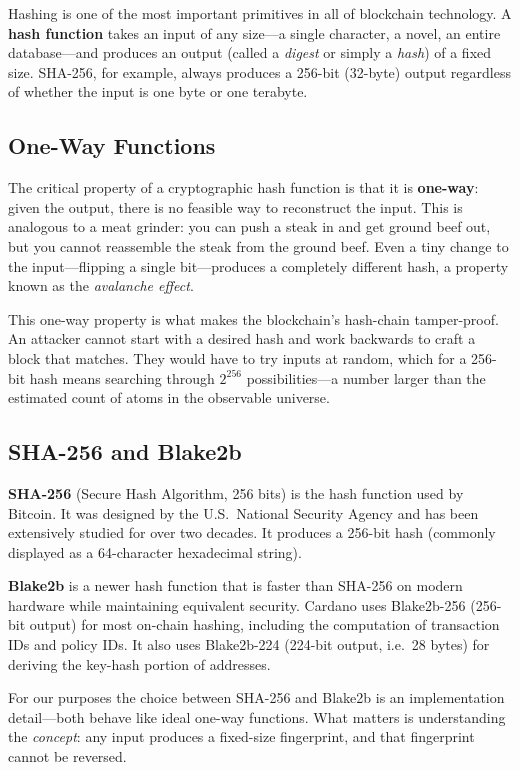 Hashing is one of the most important primitives in all of blockchain
technology.  A \textbf{hash function} takes an input of any size---a single
character, a novel, an entire database---and produces an output (called a
\emph{digest} or simply a \emph{hash}) of a fixed size.  SHA-256, for
example, always produces a 256-bit (32-byte) output regardless of whether the
input is one byte or one terabyte.

\subsection{One-Way Functions}

The critical property of a cryptographic hash function is that it is
\textbf{one-way}: given the output, there is no feasible way to reconstruct
the input.  This is analogous to a meat grinder: you can push a steak in and
get ground beef out, but you cannot reassemble the steak from the ground
beef.  Even a tiny change to the input---flipping a single bit---produces a
completely different hash, a property known as the \emph{avalanche effect}.

This one-way property is what makes the blockchain's hash-chain tamper-proof.
An attacker cannot start with a desired hash and work backwards to craft a
block that matches.  They would have to try inputs at random, which for a
256-bit hash means searching through $2^{256}$ possibilities---a number
larger than the estimated count of atoms in the observable universe.

\subsection{SHA-256 and Blake2b}

\textbf{SHA-256} (Secure Hash Algorithm, 256 bits) is the hash function used
by Bitcoin.  It was designed by the U.S.\ National Security Agency and has
been extensively studied for over two decades.  It produces a 256-bit hash
(commonly displayed as a 64-character hexadecimal string).

\textbf{Blake2b} is a newer hash function that is faster than SHA-256 on
modern hardware while maintaining equivalent security.  Cardano uses
Blake2b-256 (256-bit output) for most on-chain hashing, including the
computation of transaction IDs and policy IDs.  It also uses Blake2b-224
(224-bit output, i.e.\ 28 bytes) for deriving the key-hash portion of
addresses.

For our purposes the choice between SHA-256 and Blake2b is an implementation
detail---both behave like ideal one-way functions.  What matters is
understanding the \emph{concept}: any input produces a fixed-size fingerprint,
and that fingerprint cannot be reversed.

